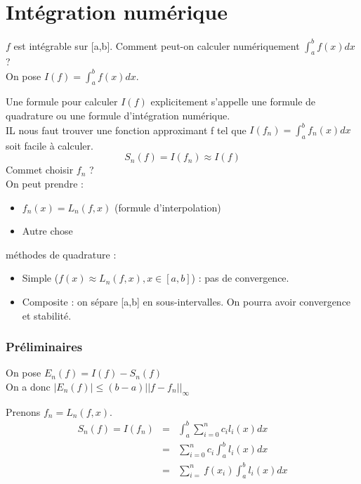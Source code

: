 \part{Intégration numérique}

$f$ est intégrable sur [a,b]. Comment peut-on calculer numériquement $\int_a^b f(x) dx$ ?\\
On pose $I(f)=\int_a^b f(x) dx$.

\bigskip
Une formule pour calculer $I(f)$ explicitement s'appelle une formule de quadrature ou une formule d'intégration numérique.\\
IL nous faut trouver une fonction approximant f tel que $I(f_n)=\int_a^b f_n(x) dx$ soit facile à calculer.
\[S_n(f)=I(f_n)\approx I(f)\]
Commet choisir $f_n$ ?\\
On peut prendre : 
\begin{itemize}
	\item $f_n(x)=L_n(f,x)$ (formule d'interpolation)
	\item Autre chose
\end{itemize}

 méthodes de quadrature :
\begin{itemize}
	\item Simple ($f(x)\approx L_n(f,x),x\in[a,b]$) : pas de convergence.
	\item Composite : on sépare [a,b] en sous-intervalles. On pourra avoir convergence et stabilité.
\end{itemize}

\section{Préliminaires}

On pose $E_n(f)=I(f)-S_n(f)$ \\
On a donc $|E_n(f)|\leq(b-a)||f-f_n||_{\infty}$

\bigskip
Prenons $f_n=L_n(f,x)$.
\begin{eqnarray*}
	S_n(f)=I(f_n)&=&\int_a^b \sum_{i=0}^n c_i l_i(x) dx \\
		     &=&\sum_{i=0}^n c_i \int_a^b l_i(x) dx \\
	      	     &=&\sum_{i=}^n f(x_i) \int_a^b l_i(x) dx
\end{eqnarray*}

